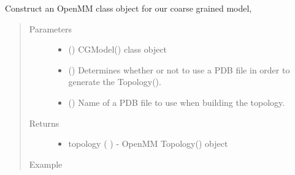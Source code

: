 \documentclass[letterpaper,12pt,english,openany,oneside]{sphinxmanual}
\begin{document}
\begin{fulllineitems}
\label{\detokenize{build:build.cg_build.build_topology}}
Construct an OpenMM  class object for our coarse grained model,
\begin{quote}\begin{description}
\item[{Parameters}] \leavevmode\begin{itemize}
\item {} 
 () \textendash{} CGModel() class object

\item {} 
 () \textendash{} Determines whether or not to use a PDB file in order to generate the Topology().

\item {} 
 () \textendash{} Name of a PDB file to use when building the topology.

\end{itemize}

\item[{Returns}] \leavevmode
\begin{itemize}
\item {} 
topology ( ) - OpenMM Topology() object

\end{itemize}


\item[{Example}] \leavevmode
\end{description}\end{quote}


\end{fulllineitems}
\end{document}
